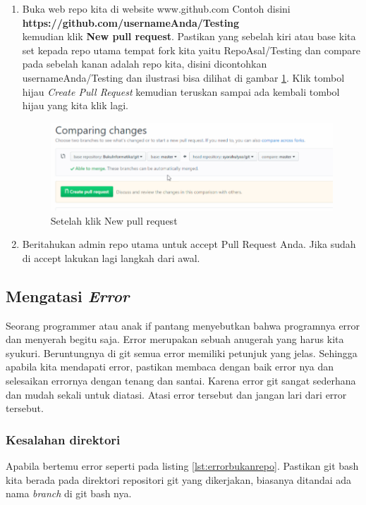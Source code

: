 \begin{enumerate}
\item Buka web repo kita di website www.github.com
Contoh disini\\
 \textbf{https://github.com/usernameAnda/Testing} \\kemudian klik \textbf{New pull request}. Pastikan yang sebelah kiri atau base kita set kepada repo utama tempat fork kita yaitu RepoAsal/Testing dan compare pada sebelah kanan adalah repo kita, disini dicontohkan usernameAnda/Testing dan ilustrasi bisa dilihat di gambar \ref{pullrequest}. Klik tombol hijau \textit{Create Pull Request} kemudian teruskan sampai ada kembali tombol hijau yang kita klik lagi.
\begin{figure}[!htbp]
\centerline{\includegraphics[width=.75\textwidth]{Figures/pullrequest}}
\caption{Setelah klik New pull request}
\label{pullrequest}
\end{figure}

\item Beritahukan admin repo utama untuk accept Pull Request Anda. Jika sudah di accept lakukan lagi langkah dari awal.
\end{enumerate}



\subsection{Mengatasi \textit{Error}}
Seorang programmer atau anak if pantang menyebutkan bahwa programnya error dan menyerah begitu saja. Error merupakan sebuah anugerah yang harus kita syukuri. Beruntungnya di git semua error memiliki petunjuk yang jelas. Sehingga apabila kita mendapati error, pastikan membaca dengan baik error nya dan selesaikan errornya dengan tenang dan santai. Karena error git sangat sederhana dan mudah sekali untuk diatasi. Atasi error tersebut dan jangan lari dari error tersebut.

\subsubsection{Kesalahan direktori}
Apabila bertemu error seperti pada listing \ref{lst:errorbukanrepo}. Pastikan git bash kita berada pada direktori repositori git yang dikerjakan, biasanya ditandai ada nama \textit{branch} di git bash nya. 

